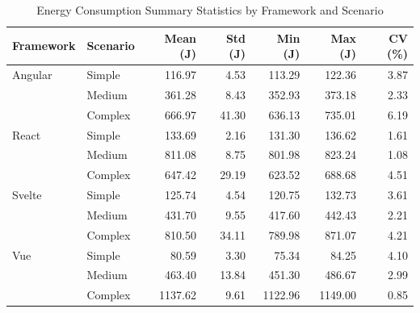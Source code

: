 \begin{table}[htbp]
\centering
\caption{Energy Consumption Summary Statistics by Framework and Scenario}
\label{tab:energy_summary}
\begin{tabular}{llrrrrr}
\toprule
\textbf{Framework} & \textbf{Scenario} & \textbf{Mean (J)} & \textbf{Std (J)} & \textbf{Min (J)} & \textbf{Max (J)} & \textbf{CV (\%)} \\
\midrule
Angular    & Simple   &  116.97 &   4.53 &  113.29 &  122.36 &  3.87 \\
           & Medium   &  361.28 &   8.43 &  352.93 &  373.18 &  2.33 \\
           & Complex  &  666.97 &  41.30 &  636.13 &  735.01 &  6.19 \\
\midrule
React      & Simple   &  133.69 &   2.16 &  131.30 &  136.62 &  1.61 \\
           & Medium   &  811.08 &   8.75 &  801.98 &  823.24 &  1.08 \\
           & Complex  &  647.42 &  29.19 &  623.52 &  688.68 &  4.51 \\
\midrule
Svelte     & Simple   &  125.74 &   4.54 &  120.75 &  132.73 &  3.61 \\
           & Medium   &  431.70 &   9.55 &  417.60 &  442.43 &  2.21 \\
           & Complex  &  810.50 &  34.11 &  789.98 &  871.07 &  4.21 \\
\midrule
Vue        & Simple   &   80.59 &   3.30 &   75.34 &   84.25 &  4.10 \\
           & Medium   &  463.40 &  13.84 &  451.30 &  486.67 &  2.99 \\
           & Complex  & 1137.62 &   9.61 & 1122.96 & 1149.00 &  0.85 \\
\bottomrule
\end{tabular}
\end{table}
